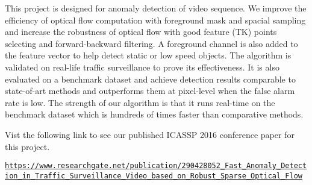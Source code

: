 This project is designed for anomaly detection of video sequence. We improve the efficiency of optical flow computation with foreground mask and spacial sampling and increase the robustness of optical flow with good feature (T\+K) points selecting and forward-\/backward filtering. A foreground channel is also added to the feature vector to help detect static or low speed objects. The algorithm is validated on real-\/life traffic surveillance to prove its effectiveness. It is also evaluated on a benchmark dataset and achieve detection results comparable to state-\/of-\/art methods and outperforms them at pixel-\/level when the false alarm rate is low. The strength of our algorithm is that it runs real-\/time on the benchmark dataset which is hundreds of times faster than comparative methods.

Vist the following link to see our published I\+C\+A\+S\+S\+P 2016 conference paper for this project.

\href{https://www.researchgate.net/publication/290428052_Fast_Anomaly_Detection_in_Traffic_Surveillance_Video_based_on_Robust_Sparse_Optical_Flow}{\tt https\+://www.\+researchgate.\+net/publication/290428052\+\_\+\+Fast\+\_\+\+Anomaly\+\_\+\+Detection\+\_\+in\+\_\+\+Traffic\+\_\+\+Surveillance\+\_\+\+Video\+\_\+based\+\_\+on\+\_\+\+Robust\+\_\+\+Sparse\+\_\+\+Optical\+\_\+\+Flow} 